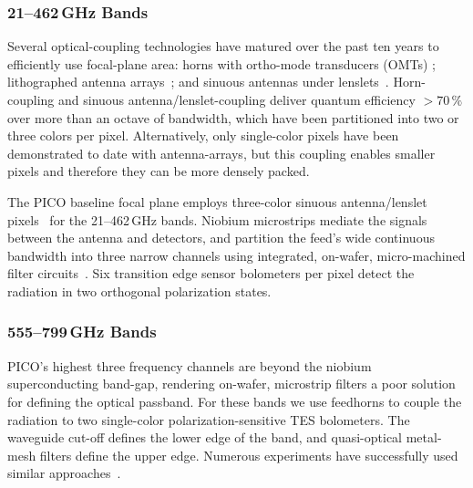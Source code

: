 \subsubsection{21--462\,GHz Bands}
\label{sec:low_freq_det} %

Several optical-coupling technologies have matured over the past ten years to efficiently use focal-plane area: horns with ortho-mode transducers (OMTs) \citep{Duff2016}; lithographed antenna arrays~\citep{BICEP2015}; and sinuous antennas under lenslets~\citep{Edwards2012}. Horn-coupling and sinuous antenna/lenslet-coupling deliver quantum efficiency $>70\,\%$ over more than an octave of bandwidth, which have been partitioned into two or three colors per pixel.  
Alternatively, only single-color pixels have been demonstrated to date with antenna-arrays, but this coupling enables smaller pixels and therefore they can be more densely packed.


The PICO baseline focal plane employs three-color sinuous antenna/lenslet pixels~\citep{Suzuki2014} for the 21--462\,GHz bands. Niobium microstrips mediate the signals between the antenna and detectors, and partition the feed's wide continuous bandwidth into three narrow channels using integrated, on-wafer, micro-machined filter circuits~\citep{OBrient2013}. Six transition edge sensor bolometers per pixel detect the radiation in two orthogonal polarization states. %

\subsubsection{555--799\,GHz Bands}
\label{sec:high_freq_det} %
%

PICO's highest three frequency channels are beyond the niobium superconducting band-gap, rendering on-wafer, microstrip filters a poor solution for defining the optical passband. For these bands we use feedhorns to couple the radiation to two single-color polarization-sensitive TES bolometers. %
The waveguide cut-off defines the lower edge of the band, and quasi-optical metal-mesh filters define the upper edge. Numerous experiments have successfully used similar approaches~\citep{Shirokoff2011,Bleem2012,Turner2001}. 


